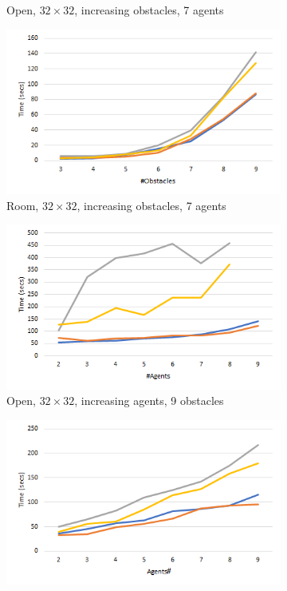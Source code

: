 \documentclass[letterpaper]{article} %
\begin{document}
\begin{figure}[t]
\begin{subfigure}[b]{0.2\textwidth}
      \caption{Open, $32\times 32$, increasing obstacles, 7 agents}
      \label{fig:ObstaclesOpen}
    \end{subfigure}
    \begin{subfigure}[b]{0.2\textwidth}
      \includegraphics[scale=.27]{Figures/ObstaclesTimeRoom32.png}
      \caption{Room, $32\times 32$, increasing obstacles, 7 agents}
      \label{fig:ObstaclesRoom}
    \end{subfigure}
    \begin{subfigure}[b]{0.2\textwidth}
      \includegraphics[scale=.27]{Figures/AgentsTimeOpen32.png}
      \caption{Open, $32\times 32$, increasing agents, 9 obstacles}
      \label{fig:AgentsOpen}
    \end{subfigure}
    \begin{subfigure}[b]{0.2\textwidth}
      \includegraphics[scale=.27]{Figures/AgentsTimeRoom32.png}

\end{subfigure}
\end{figure}
\end{document}
